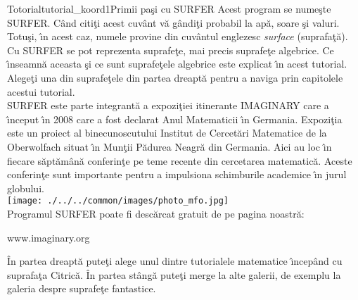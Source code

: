 \begin{surferIntroPage}{Totorial}{tutorial_koord1}{Primii pa\c si cu SURFER}
Acest program se nume\c ste SURFER. C\^and citi\c ti acest cuv\^ant v\u a g\^andi\c ti probabil la ap\u a,
soare \c si valuri. Totu\c si, \^\i n acest caz, numele provine din cuv\^antul englezesc {\it surface} (suprafa\c t\u a).
\\
Cu SURFER se pot reprezenta suprafe\c te, mai precis suprafe\c te algebrice. Ce \^\i nseamn\u a aceasta
\c si ce sunt suprafe\c tele algebrice este explicat \^\i n acest tutorial. Alege\c ti una din suprafe\c tele din partea dreapt\u a pentru a naviga prin capitolele acestui tutorial.\\
SURFER este parte integrant\u a a expozi\c tiei itinerante IMAGINARY care a \^\i nceput \^\i n 2008 care a
fost declarat Anul Matematicii \^\i n Germania. Expozi\c tia este un proiect al binecunoscutului Institut
de Cercet\u ari Matematice de la Oberwolfach situat \^\i n Mun\c tii P\u adurea Neagr\u a din Germania. Aici au loc \^\i n fiecare s\u apt\u am\^an\u a conferin\c te pe teme recente din cercetarea matematic\u a. Aceste conferin\c te sunt importante pentru a impulsiona schimburile academice \^\i n jurul globului. \\
\vspace{0.2cm} \hspace{3.5cm}\texttt{[image: ./../../common/images/photo\_mfo.jpg]}\\
Programul SURFER poate fi desc\u arcat gratuit de pe pagina noastr\u a: \\
\begin{centering}
www.imaginary.org\\
\end{centering}
 \vspace{0.2cm}
\^In partea dreapt\u a pute\c ti alege unul dintre tutorialele matematice \^\i ncep\^and cu suprafa\c ta Citric\u a. \^In partea st\^ang\u a pute\c ti merge la alte galerii, de exemplu la galeria despre suprafe\c te fantastice.
\end{surferIntroPage}